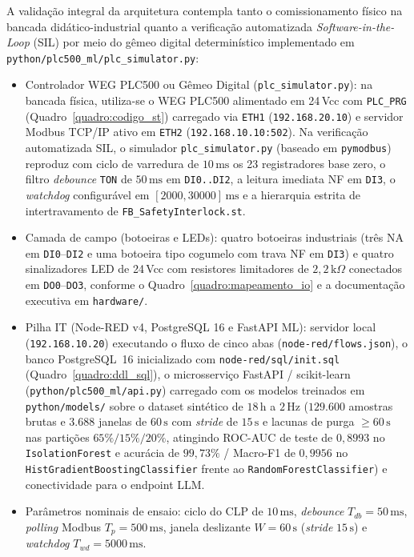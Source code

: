 A validação integral da arquitetura contempla tanto o comissionamento físico na bancada didático-industrial quanto a verificação automatizada \textit{Software-in-the-Loop} (SIL) por meio do gêmeo digital determinístico implementado em \texttt{python/\allowbreak plc500\_\allowbreak ml/\allowbreak plc\_\allowbreak simulator.py}:
\begin{itemize}
  \item Controlador WEG PLC500 ou Gêmeo Digital (\texttt{plc\_\allowbreak simulator.py}): na bancada física, utiliza-se o WEG PLC500 alimentado em 24\,Vcc com \texttt{PLC\_PRG} (Quadro~\ref{quadro:codigo_st}) carregado via \texttt{ETH1} (\texttt{192.168.20.10}) e servidor Modbus TCP/IP ativo em \texttt{ETH2} (\texttt{192.168.10.10:502}). Na verificação automatizada SIL, o simulador \texttt{plc\_\allowbreak simulator.py} (baseado em \texttt{pymodbus}) reproduz com ciclo de varredura de $10\,\text{ms}$ os 23 registradores base zero, o filtro \textit{debounce} \texttt{TON} de $50\,\text{ms}$ em \texttt{DI0..DI2}, a leitura imediata NF em \texttt{DI3}, o \textit{watchdog} configurável em $[2000, 30000]\,\text{ms}$ e a hierarquia estrita de intertravamento de \texttt{FB\_\allowbreak Safety\allowbreak Interlock.st}.
  \item Camada de campo (botoeiras e LEDs): quatro botoeiras industriais (três NA em \texttt{DI0}--\texttt{DI2} e uma botoeira tipo cogumelo com trava NF em \texttt{DI3}) e quatro sinalizadores LED de 24\,Vcc com resistores limitadores de $2{,}2\,\text{k}\Omega$ conectados em \texttt{DO0}--\texttt{DO3}, conforme o Quadro~\ref{quadro:mapeamento_io} e a documentação executiva em \texttt{hardware/}.
  \item Pilha IT (Node-RED v4, PostgreSQL 16 e FastAPI ML): servidor local (\texttt{192.168.10.20}) executando o fluxo de cinco abas (\texttt{node-red/\allowbreak flows.json}), o banco PostgreSQL~16 inicializado com \texttt{node-red/\allowbreak sql/\allowbreak init.sql} (Quadro~\ref{quadro:ddl_sql}), o microsserviço FastAPI / scikit-learn (\texttt{python/\allowbreak plc500\_\allowbreak ml/\allowbreak api.py}) carregado com os modelos treinados em \texttt{python/\allowbreak models/} sobre o dataset sintético de $18\,\text{h}$ a $2\,\text{Hz}$ ($129.600$ amostras brutas e $3.688$ janelas de $60\,\text{s}$ com \textit{stride} de $15\,\text{s}$ e lacunas de purga $\ge 60\,\text{s}$ nas partições $65\%/15\%/20\%$, atingindo ROC-AUC de teste de $0{,}8993$ no \texttt{Isolation\allowbreak Forest} e acurácia de $99{,}73\%$ / Macro-F1 de $0{,}9956$ no \texttt{HistGradient\allowbreak Boosting\allowbreak Classifier} frente ao \texttt{RandomForest\allowbreak Classifier}) e conectividade para o endpoint LLM.
  \item Parâmetros nominais de ensaio: ciclo do CLP de $10\,\text{ms}$, \textit{debounce} $T_{db} = 50\,\text{ms}$, \textit{polling} Modbus $T_p = 500\,\text{ms}$, janela deslizante $W = 60\,\text{s}$ (\textit{stride} $15\,\text{s}$) e \textit{watchdog} $T_{wd} = 5000\,\text{ms}$.
\end{itemize}

